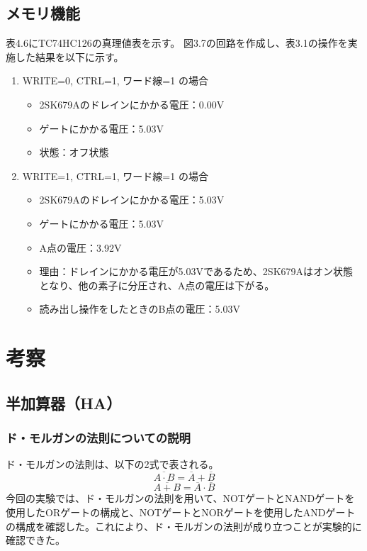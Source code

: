 \documentclass{jlreq}
\numberwithin{equation}{section}
\begin{document}
\subsection{メモリ機能}
表4.6にTC74HC126の真理値表を示す。
図3.7の回路を作成し、表3.1の操作を実施した結果を以下に示す。
\begin{enumerate}
  \item WRITE=0, CTRL=1, ワード線=1 の場合
  \begin{itemize}
    \item 2SK679Aのドレインにかかる電圧：0.00V
    \item ゲートにかかる電圧：5.03V
    \item 状態：オフ状態
  \end{itemize}
  \item WRITE=1, CTRL=1, ワード線=1 の場合
  \begin{itemize}
    \item 2SK679Aのドレインにかかる電圧：5.03V
    \item ゲートにかかる電圧：5.03V
    \item A点の電圧：3.92V
    \item 理由：ドレインにかかる電圧が5.03Vであるため、2SK679Aはオン状態となり、他の素子に分圧され、A点の電圧は下がる。
    \item 読み出し操作をしたときのB点の電圧：5.03V
  \end{itemize}
\end{enumerate}

\section{考察}

\subsection{半加算器（HA）}
\subsubsection{ド・モルガンの法則についての説明}
ド・モルガンの法則は、以下の2式で表される。
\begin{equation}
  \overline{A \cdot B} = \overline{A} + \overline{B}
\end{equation}
\begin{equation}
  \overline{A + B} = \overline{A} \cdot \overline{B}
\end{equation}
今回の実験では、ド・モルガンの法則を用いて、NOTゲートとNANDゲートを使用したORゲートの構成と、NOTゲートとNORゲートを使用したANDゲートの構成を確認した。これにより、ド・モルガンの法則が成り立つことが実験的に確認できた。
\end{document}
